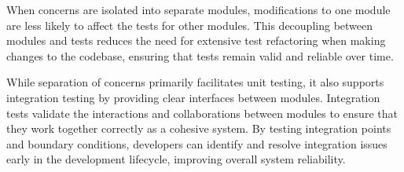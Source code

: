 When concerns are isolated into separate modules, modifications to one module are less likely to affect the tests for other modules.
This decoupling between modules and tests reduces the need for extensive test refactoring when making changes to the codebase, ensuring that tests remain valid and reliable over time.
 \par
While separation of concerns primarily facilitates unit testing, it also supports integration testing by providing clear interfaces between modules.
Integration tests validate the interactions and collaborations between modules to ensure that they work together correctly as a cohesive system.
By testing integration points and boundary conditions, developers can identify and resolve integration issues early in the development lifecycle, improving overall system reliability.


